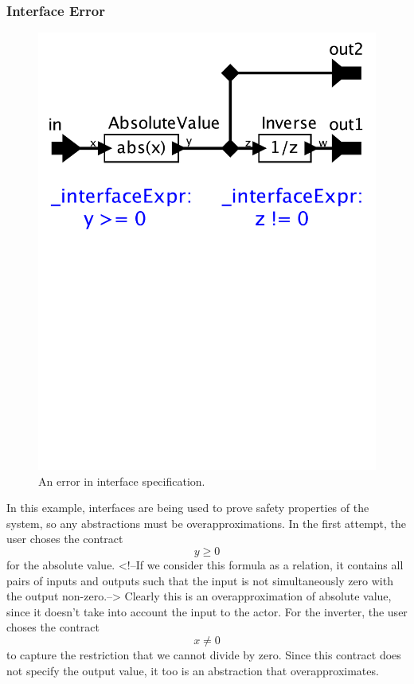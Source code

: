 \documentclass[preprint,11pt]{sigplanconf}
\begin{document}
\subsubsection{Interface Error}
\begin{figure}[htbp]
\centering
\includegraphics[width=\columnwidth]{figs/absoluteError}
\caption{An error in interface specification.}
\label{fig:absoluteError}
\end{figure}

In this example, interfaces are being used to prove safety properties of the
system, so any abstractions must be overapproximations.
In the first attempt, the user choses the contract
\[
y \ge 0
\]
for the absolute value.
<!--If we consider this formula as a relation,
it contains all pairs of inputs and outputs such that
the input is not simultaneously zero with the output non-zero.-->
Clearly this is an overapproximation of absolute value, since it doesn't take
into account the input to the actor. For the inverter, the user choses the
contract
\[
x \ne 0
\]
to capture the restriction that we cannot divide by zero.
Since this contract does not specify the output value, it too is an abstraction
that overapproximates.
\end{document}
